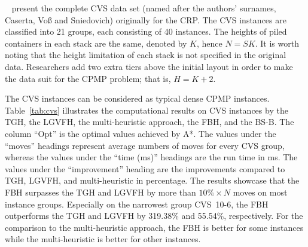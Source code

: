 \documentclass[review,3p,times,12pt,number]{elsarticle}\usepackage{amsmath}\usepackage{amssymb}
\renewcommand{\citet}[1]{\citeauthor{#1}~\citep{#1}}
\begin{document}
\citet{cas2011} present the complete CVS data set (named after the authors' surnames, Caserta, Vo{\ss} and Sniedovich) originally for the CRP\@. The CVS instances are classified into 21 groups, each consisting of 40 instances.
The heights of piled containers in each stack are the same, denoted by $K$, hence $N=SK$. It is worth noting that the height limitation of each stack is not specified in the original data.
Researchers add two extra tiers above the initial layout in order to make the data suit for the CPMP problem; that is, $H=K+2$.

The CVS instances can be considered as typical dense CPMP instances.
Table~\ref{tab:cvs} illustrates the computational results on CVS instances by the TGH, the LGVFH, the multi-heuristic approach, the FBH, and the BS-B\@.
The column ``Opt'' is the optimal values achieved by A*.
The values under the ``moves'' headings represent average numbers of moves for every CVS group, whereas the values under the ``time (ms)'' headings are the run time in ms. The values under the ``improvement'' heading are the improvements compared to TGH, LGVFH, and multi-heuristic in percentage.
The results showcase that the FBH surpasses the TGH and LGVFH by more than $10\%\times N$ moves on most instance groups. Especially on the narrowest group CVS~10-6, the FBH outperforms the TGH and LGVFH by 319.38\% and 55.54\%, respectively. For the comparison to the multi-heuristic approach, the FBH is better for some instances while the multi-heuristic is better for other instances.
\end{document}
